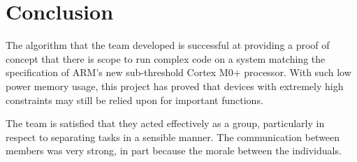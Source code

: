 \chapter{Conclusion}

The algorithm that the team developed is successful at providing a proof of concept that there is scope to run complex code on a system matching the specification of ARM's new sub-threshold Cortex M0+ processor. With such low power memory usage, this project has proved that devices with extremely high constraints may still be relied upon for important functions.

The team is satisfied that they acted effectively as a group, particularly in respect to separating tasks in a sensible manner. The communication between members was very strong, in part because the morale between the individuals. 